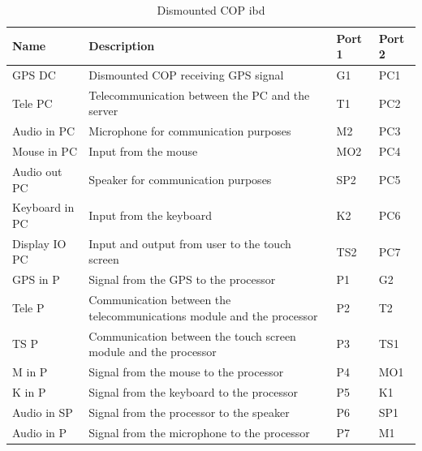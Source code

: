 \begin{table}[H]  
\centering

\begin{tabular}{|l|p{8cm}|l|l|} 
\hline
	\textbf{Name}		& \textbf{Description} & \textbf{Port 1} & \textbf{Port 2} \\\hline
GPS DC	    & Dismounted COP receiving GPS signal												 & G1 &  PC1 \\\hline
Tele PC     & Telecommunication between the PC and the server							   		 & T1 &  PC2 \\\hline		
Audio in PC & Microphone for communication purposes  											 & M2 &  PC3 \\\hline				  
Mouse in PC	    & Input from the mouse										 					 & MO2 &  PC4\\\hline				  
Audio out PC	        & Speaker for communication purposes 			  						 & SP2 & PC5 \\\hline			
Keyboard in PC	& Input from the keyboard   				 				 					 & K2 &  PC6 \\\hline				  
Display IO PC	& Input and output from user to the touch screen								 & TS2 &  PC7 \\\hline				  
	
GPS in P	& Signal from the GPS to the processor								                 & P1 & G2 \\\hline				  			
Tele P		& Communication between the telecommunications module and the processor              & P2 & T2 \\\hline				  			
TS P		& Communication between the touch screen module and the processor          			 & P3 & TS1 \\\hline			  			
M in P		& Signal from the mouse to the processor          								     & P4 & MO1 \\\hline				  	
K in P		& Signal from the keyboard to the processor          								 & P5 & K1 \\\hline				  			
Audio in SP	& Signal from the processor to the speaker					             			 & P6 & SP1 \\\hline				  		Audio in P	& Signal from the microphone to the processor					           		     & P7 & M1 \\\hline				  			
												   
\end{tabular}
\caption {Dismounted COP ibd} 
\end{table} 

